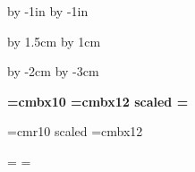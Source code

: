 












\hsize=210mm
\vsize=297mm

\parindent=0pt

\advance\voffset by -1in
\advance\hoffset by -1in

\advance\voffset by 1.5cm
\advance\hoffset by 1cm

\advance\hsize by -2cm
\advance\vsize by -3cm

\def\epsfsize#1#2{#1}

\font\bf=cmbx10
\font\largebf=cmbx12 scaled 
\footline={\hss\folio\hss}

\font\medium=cmr10 scaled \magstephalf
\font\largebx=cmbx12

\newtoks\datestamptoks


\enablehyperlinks[dvipdfm]

\newdimen\twozerosdimen
{}=\hbox{{}}
\twozerosdimen=

\newcount\sectionctr
{}

